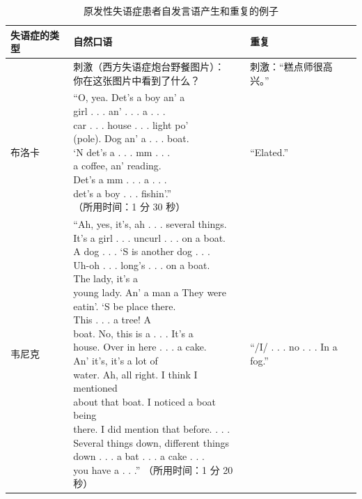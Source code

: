 \begin{table}[htbp]
	\caption{原发性失语症患者自发言语产生和重复的例子} \label{tab:55_2} \centering
	\begin{tabular}{lll}
		\toprule
		失语症的类型 & 自然口语 & 重复 \\
		\midrule
		 & \makecell[l]{刺激（西方失语症炮台野餐图片）：\\你在这张图片中看到了什么？} & 刺激：“糕点师很高兴。” \\
		布洛卡 & \makecell[l]{“O, yea. Det’s a boy an’ a \\girl . . . an’ . . . a . . . \\car . . . house . . . light po’ \\ (pole). Dog an’ a . . . boat.\\ ‘N det’s a . . . mm . . . \\a coffee, an’ reading. \\ Det’s a mm . . . a . . . \\det’s a boy . . . fishin’.” \\（所用时间：1 分 30 秒）} & “Elated.” \\
		韦尼克 & \makecell[l]{“Ah, yes, it’s, ah . . . several things. \\It’s a girl . . . uncurl . . . on a boat. \\ A dog . . . ‘S is another dog . . . \\Uh-oh . . . long’s . . . on a boat. \\The lady, it’s a \\ young lady. An’ a man a They were \\eatin’. ‘S be place there. \\This . . . a tree! A \\boat. No, this is a . . . It’s a\\ house. Over in here . . . a cake. \\An’ it’s, it’s a lot of \\water. Ah, all right. I think I mentioned\\ about that boat. I noticed a boat being \\ there. I did mention that before. . . . \\Several things down, different things \\	down . . . a bat . . . a cake . . . \\you have a . . .”  （所用时间：1 分 20 秒）} & “/I/ . . . no . . . In a fog.” \\

\end{tabular}
\end{table}
